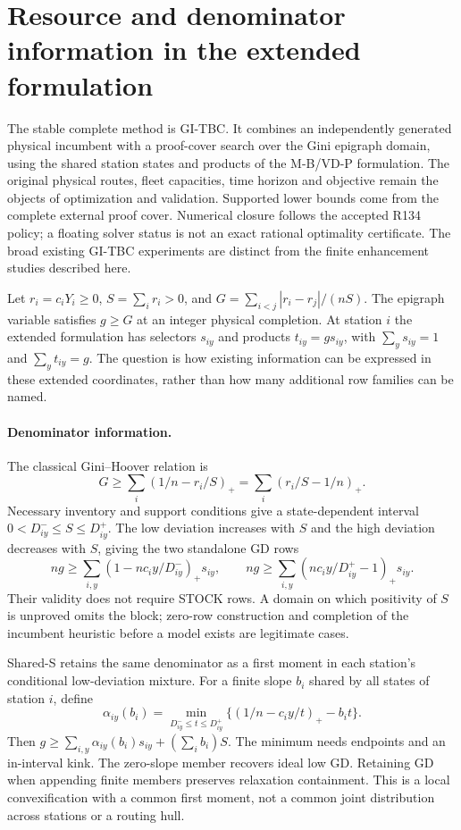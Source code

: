 \section{Resource and denominator information in the extended formulation}
\label{sec:resource-denominator-feedback}

The stable complete method is GI-TBC. It combines an independently generated
physical incumbent with a proof-cover search over the Gini epigraph domain,
using the shared station states and products of the M-B/VD-P formulation.
The original physical routes, fleet capacities, time horizon and objective
remain the objects of optimization and validation. Supported lower bounds
come from the complete external proof cover. Numerical closure follows the
accepted R134 policy; a floating solver status is not an exact rational
optimality certificate. The broad existing GI-TBC experiments are distinct
from the finite enhancement studies described here.

Let $r_i=c_iY_i\ge0$, $S=\sum_i r_i>0$, and
$G=\sum_{i<j}|r_i-r_j|/(nS)$. The epigraph variable satisfies $g\ge G$ at
an integer physical completion. At station $i$ the extended formulation has
selectors $s_{iy}$ and products $t_{iy}=g s_{iy}$, with
$\sum_y s_{iy}=1$ and $\sum_y t_{iy}=g$. The question is how existing
information can be expressed in these extended coordinates, rather than
how many additional row families can be named.

\paragraph{Denominator information.}
The classical Gini--Hoover relation is
\[
G\ge\sum_i(1/n-r_i/S)_+=\sum_i(r_i/S-1/n)_+.
\]
Necessary inventory and support conditions give a state-dependent interval
$0<D^-_{iy}\le S\le D^+_{iy}$. The low deviation increases with $S$ and
the high deviation decreases with $S$, giving the two standalone GD rows
\[
ng\ge\sum_{i,y}(1-nc_i y/D^-_{iy})_+s_{iy},\qquad
ng\ge\sum_{i,y}(nc_i y/D^+_{iy}-1)_+s_{iy}.
\]
Their validity does not require STOCK rows. A domain on which positivity
of $S$ is unproved omits the block; zero-row construction and completion
of the incumbent heuristic before a model exists are legitimate cases.

Shared-S retains the same denominator as a first moment in each station's
conditional low-deviation mixture. For a finite slope $b_i$ shared by all
states of station $i$, define
\[
\alpha_{iy}(b_i)=\min_{D^-_{iy}\le t\le D^+_{iy}}
 \{(1/n-c_i y/t)_+-b_i t\}.
\]
Then $g\ge\sum_{i,y}\alpha_{iy}(b_i)s_{iy}+(\sum_i b_i)S$.
The minimum needs endpoints and an in-interval kink. The zero-slope member
recovers ideal low GD. Retaining GD when appending finite members preserves
relaxation containment. This is a local convexification with a common first
moment, not a common joint distribution across stations or a routing hull.

